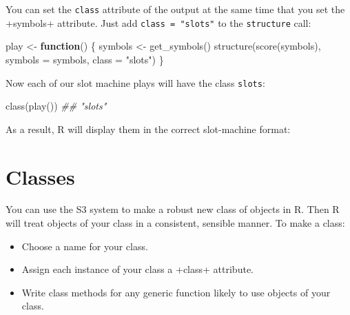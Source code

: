 \documentclass[
  letterpaper,
  DIV=11,
  numbers=noendperiod]{scrbook}
\newenvironment{Shaded}{\begin{snugshade}}{\end{snugshade}}
\newcommand{\AttributeTok}[1]{\textcolor[rgb]{0.40,0.45,0.13}{#1}}
\newcommand{\ControlFlowTok}[1]{\textcolor[rgb]{0.00,0.23,0.31}{\textbf{#1}}}
\newcommand{\DocumentationTok}[1]{\textcolor[rgb]{0.37,0.37,0.37}{\textit{#1}}}
\newcommand{\FunctionTok}[1]{\textcolor[rgb]{0.28,0.35,0.67}{#1}}
\newcommand{\NormalTok}[1]{\textcolor[rgb]{0.00,0.23,0.31}{#1}}
\newcommand{\OtherTok}[1]{\textcolor[rgb]{0.00,0.23,0.31}{#1}}
\newcommand{\StringTok}[1]{\textcolor[rgb]{0.13,0.47,0.30}{#1}}
\providecommand{\tightlist}{%
  \setlength{\itemsep}{0pt}\setlength{\parskip}{0pt}}
\begin{document}
You can set the \texttt{class} attribute of the output at the same time
that you set the +symbols+ attribute. Just add
\texttt{class\ =\ "slots"} to the \texttt{structure} call:

\begin{Shaded}
\begin{Highlighting}[]
\NormalTok{play }\OtherTok{\textless{}{-}} \ControlFlowTok{function}\NormalTok{() \{}
\NormalTok{  symbols }\OtherTok{\textless{}{-}} \FunctionTok{get\_symbols}\NormalTok{()}
  \FunctionTok{structure}\NormalTok{(}\FunctionTok{score}\NormalTok{(symbols), }\AttributeTok{symbols =}\NormalTok{ symbols, }\AttributeTok{class =} \StringTok{"slots"}\NormalTok{)}
\NormalTok{\}}
\end{Highlighting}
\end{Shaded}

Now each of our slot machine plays will have the class \texttt{slots}:

\begin{Shaded}
\begin{Highlighting}[]
\FunctionTok{class}\NormalTok{(}\FunctionTok{play}\NormalTok{())}
\DocumentationTok{\#\# "slots"}
\end{Highlighting}
\end{Shaded}

As a result, R will display them in the correct slot-machine format:

\begin{Shaded}
\end{Shaded}

\section{Classes}\label{classes}

You can use the S3 system to make a robust new class of objects in R.
Then R will treat objects of your class in a consistent, sensible
manner. To make a class:

\begin{itemize}
\tightlist
\item
  Choose a name for your class.
\item
  Assign each instance of your class a +class+ attribute.
\item
  Write class methods for any generic function likely to use objects of
  your class.
\end{itemize}
\end{document}
